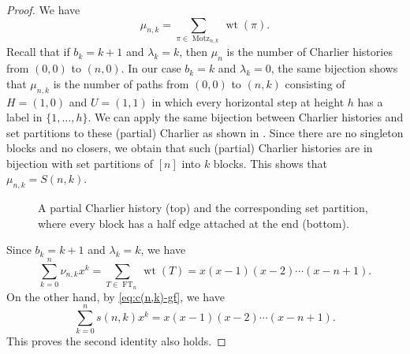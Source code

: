 \documentclass[oneside]{book}
\numberwithin{equation}{section}
\theoremstyle{definition}
\newcommand\Motz{\operatorname{Motz}}
\newcommand\FT{\operatorname{FT}}
\newcommand\wt{\operatorname{wt}}
\newcommand\hlabel[3]{\node at (#1+0.5,#2+0.3) {\( #3 \)};}
\begin{document}
\begin{proof}
  We have
  \[
    \mu_{n,k} = \sum_{\pi\in \Motz_{n,k}}  \wt(\pi).
  \]
  Recall that if \( b_k=k+1 \) and \( \lambda_k = k \), then
  \( \mu_n \) is the number of Charlier histories from \( (0,0) \) to
  \( (n,0) \). In our case \( b_k = k \) and \( \lambda_k=0 \), the
  same bijection shows that \( \mu_{n,k} \) is the number of paths
  from \( (0,0) \) to \( (n,k) \) consisting of \( H=(1,0) \) and
  \( U=(1,1) \) in which every horizontal step at height \( h \) has a
  label in \( \{ 1,\dots,h \} \). We can apply the same bijection
  between Charlier histories and set partitions to these (partial)
  Charlier as shown in . Since there are
  no singleton blocks and no closers, we obtain that such (partial)
  Charlier histories are in bijection with set partitions of \( [n] \)
  into \( k \) blocks.
  This shows that \( \mu_{n,k} = S(n,k) \).

  \begin{figure}
  \centering
{}
\caption{A partial Charlier history (top) and the corresponding set
  partition, where every block has a half edge attached at the end
  (bottom).}
  \label{fig:Charlier-history-1}
\end{figure}

  Since \( b_k=k+1 \) and \( \lambda_k = k \), we have
  \[
    \sum_{k=0}^n \nu_{n,k}x^k = \sum_{T\in\FT_n} \wt(T)
    = x(x-1)(x-2) \cdots (x-n+1).
  \]
  On the other hand, by \eqref{eq:c(n,k)-gf}, we have
  \[
       \sum_{k=0}^n s(n,k)x^k = x(x-1)(x-2) \cdots (x-n+1).
  \]
  This proves the second identity also holds.
\end{proof}
\end{document}
